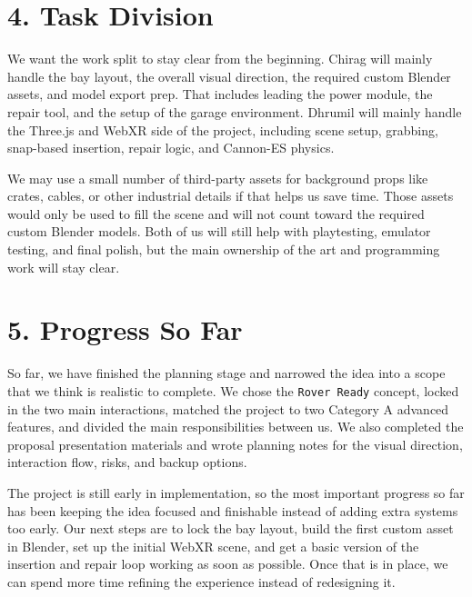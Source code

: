 \documentclass{article}
\begin{document}
\section*{4. Task Division}

We want the work split to stay clear from the beginning. Chirag will mainly handle the bay layout, the overall visual direction, the required custom Blender assets, and model export prep. That includes leading the power module, the repair tool, and the setup of the garage environment. Dhrumil will mainly handle the Three.js and WebXR side of the project, including scene setup, grabbing, snap-based insertion, repair logic, and Cannon-ES physics.

We may use a small number of third-party assets for background props like crates, cables, or other industrial details if that helps us save time. Those assets would only be used to fill the scene and will not count toward the required custom Blender models. Both of us will still help with playtesting, emulator testing, and final polish, but the main ownership of the art and programming work will stay clear.

\section*{5. Progress So Far}

So far, we have finished the planning stage and narrowed the idea into a scope that we think is realistic to complete. We chose the \texttt{Rover Ready} concept, locked in the two main interactions, matched the project to two Category A advanced features, and divided the main responsibilities between us. We also completed the proposal presentation materials and wrote planning notes for the visual direction, interaction flow, risks, and backup options.

The project is still early in implementation, so the most important progress so far has been keeping the idea focused and finishable instead of adding extra systems too early. Our next steps are to lock the bay layout, build the first custom asset in Blender, set up the initial WebXR scene, and get a basic version of the insertion and repair loop working as soon as possible. Once that is in place, we can spend more time refining the experience instead of redesigning it.
\end{document}
